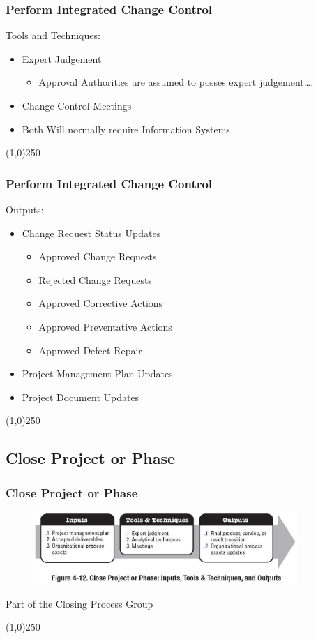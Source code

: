 \begin{frame}
\frametitle{Perform Integrated Change Control}
Tools and Techniques:
\begin{itemize}
	\item Expert Judgement
		\begin{itemize}
			\item Approval Authorities are assumed to posses expert judgement\ldots.
		\end{itemize}
	\item Change Control Meetings
	\item Both Will normally require Information Systems
\end{itemize}
\end{frame}\begin{center}\line(1,0){250}\end{center}
%
%

\begin{frame}
\frametitle{Perform Integrated Change Control}
Outputs:
\begin{itemize}
	\item Change Request Status Updates
		\begin{itemize}
			\item Approved Change Requests
			\item Rejected Change Requests
			\item Approved Corrective Actions
			\item Approved Preventative Actions
			\item Approved Defect Repair
		\end{itemize}
	\item Project Management Plan Updates
	\item Project Document Updates
\end{itemize}
\end{frame}\begin{center}\line(1,0){250}\end{center}
%
%



\subsection{Close Project or Phase}



\begin{frame}
\frametitle{Close Project or Phase}
\begin{figure}
	\centering
		\includegraphics[width = 10cm]{images/Fig4-12.jpg}
	\label{fig:4-12}
\end{figure}
Part of the Closing Process Group
\end{frame}\begin{center}\line(1,0){250}\end{center}
%
%

